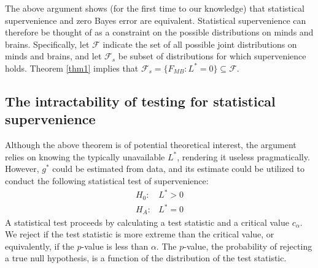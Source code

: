 \documentclass{article}
\providecommand{\mc}[1]{\mathcal{#1}}
\begin{document}
The above argument shows (for the first time to our knowledge) that statistical supervenience and zero Bayes error are equivalent. Statistical supervenience can therefore be thought of as a constraint on the possible distributions on minds and brains.  Specifically, let $\mc{F}$ indicate the set of all possible joint distributions on minds and brains, and let $\mc{F}_s$ be subset of distributions for which supervenience holds. Theorem \ref{thm1} implies that $\mc{F}_s = \{F_{MB} : L^*=0\} \subseteq \mc{F}$.


\subsection*{The intractability of testing for statistical supervenience} %
\label{sub:subsection_name}


Although the above theorem is of potential theoretical interest, the argument relies on knowing the typically unavailable $L^*$, rendering it useless pragmatically.  However,  $g^*$ could be estimated from data, and its estimate could be utilized to conduct the following statistical test of supervenience:
\begin{align*} 
	H_0:& L^* > 0 \\
	H_A:& L^*=0
\end{align*}
A statistical test proceeds by calculating a test statistic and a critical value $c_\alpha$.  We reject if the test statistic is more extreme than the critical value, or equivalently, if the $p$-value is less than $\alpha$.   The $p$-value, the probability of rejecting a true null hypothesis, is a function of the distribution of the test statistic.  
\end{document}
